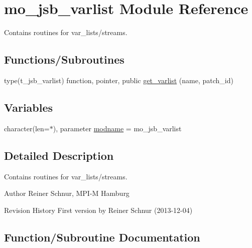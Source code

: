 \hypertarget{namespacemo__jsb__varlist}{}\section{mo\+\_\+jsb\+\_\+varlist Module Reference}
\label{namespacemo__jsb__varlist}


Contains routines for var\+\_\+lists/streams.  


\subsection*{Functions/\+Subroutines}
\begin{DoxyCompactItemize}
\item 
type(t\+\_\+jsb\+\_\+varlist) function, pointer, public \hyperlink{namespacemo__jsb__varlist_adb20739c60013ec241ba5044f198ce74}{get\+\_\+varlist} (name, patch\+\_\+id)
\end{DoxyCompactItemize}
\subsection*{Variables}
\begin{DoxyCompactItemize}
\item 
character(len=$\ast$), parameter \hyperlink{namespacemo__jsb__varlist_a5689561f18201663129fe99f0badd5cf}{modname} = \textquotesingle{}mo\+\_\+jsb\+\_\+varlist\textquotesingle{}
\end{DoxyCompactItemize}


\subsection{Detailed Description}
Contains routines for var\+\_\+lists/streams. 

\begin{DoxyAuthor}{Author}
Reiner Schnur, M\+P\+I-\/\+M Hamburg
\end{DoxyAuthor}
\begin{DoxyParagraph}{Revision History}
First version by Reiner Schnur (2013-\/12-\/04) 
\end{DoxyParagraph}


\subsection{Function/\+Subroutine Documentation}
\hypertarget{namespacemo__jsb__varlist_adb20739c60013ec241ba5044f198ce74}{}
